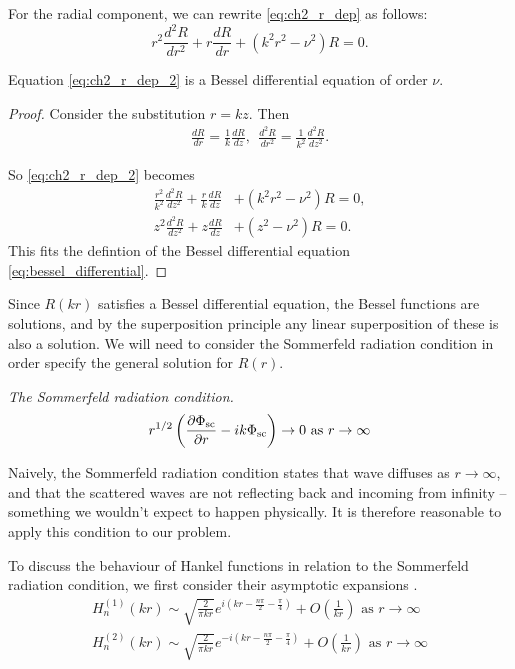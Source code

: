 For the radial component, we can rewrite \eqref{eq:ch2_r_dep} as follows:
    \begin{equation}\label{eq:ch2_r_dep_2}
        r^2 \frac{d^2 R}{dr^2} + r \frac{d R}{dr} + (k^2r^2 - \nu^2) R = 0.
    \end{equation}
    \begin{propn}
    Equation \eqref{eq:ch2_r_dep_2} is a Bessel differential equation of order $\nu$.
    \end{propn}
    \begin{proof} Consider the substitution $r=kz$. Then
        \begin{align*}
            \frac{dR}{dr} = \frac{1}{k} \frac{dR}{dz}, ~~
            \frac{d^2R}{dr^2} = \frac{1}{k^2} \frac{d^2R}{dz^2}.
        \end{align*}\par
    So \eqref{eq:ch2_r_dep_2} becomes
        \begin{align}
            \frac{r^2}{k^2}\frac{d^2R}{dz^2}
                + \frac{r}{k}\frac{dR}{dz}
                &+ (k^2r^2 - \nu^2)R = 0, \\
            z^2 \frac{d^2 R}{dz^2}
                + z \frac{dR}{dz}
                &+ (z^2 - \nu^2)R = 0.
        \end{align}
    This fits the defintion of the Bessel differential equation \eqref{eq:bessel_differential}.
    \end{proof}

Since $R(kr)$ satisfies a Bessel differential equation, the Bessel functions are solutions, and by the superposition principle any linear superposition of these is also a solution. We will need to consider the Sommerfeld radiation condition in order specify the general solution for $R(r)$.

\begin{defn}\emph{The Sommerfeld radiation condition.} \parencite{martin06scattering} \label{defn:sommerfeld_radiation_condition}
  \[ r^{1/2} \left( \frac{\partial \Phi_{\text{sc}}}{\partial r} - ik\Phi_{\text{sc}} \right) \rightarrow 0 \text{ as } r \rightarrow \infty\]
\end{defn}
Naively, the Sommerfeld radiation condition states that wave diffuses as $r\rightarrow\infty$, and that the scattered waves are not reflecting back and incoming from infinity -- something we wouldn't expect to happen physically. It is therefore reasonable to apply this condition to our problem.

To discuss the behaviour of Hankel functions in relation to the Sommerfeld radiation condition, we first consider their asymptotic expansions \parencite{wong89asymptoticapprox}.
\begin{gather*}
  H^{(1)}_n(kr) \sim \sqrt{\frac{2}{\pi kr}} e^{i(kr - \frac{n\pi}{2} - \frac{\pi}{4})} + O\left(\frac{1}{kr}\right) \text{ as } r \rightarrow \infty \\
  H^{(2)}_n(kr) \sim \sqrt{\frac{2}{\pi kr}} e^{-i(kr - \frac{n\pi}{2} - \frac{\pi}{4})} + O\left(\frac{1}{kr}\right) \text{ as } r \rightarrow \infty \\
\end{gather*}

